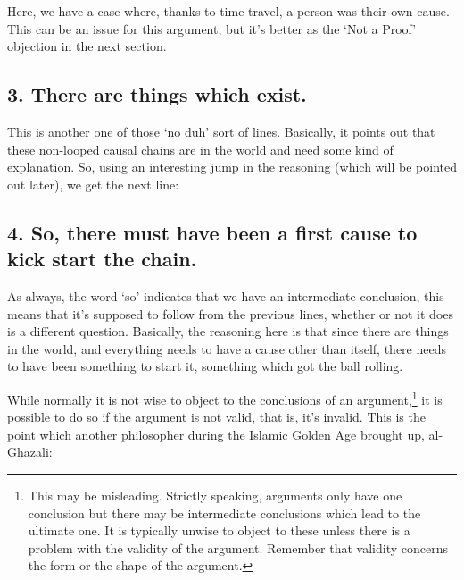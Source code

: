 Here, we have a case where, thanks to time-travel, a person was their own cause. This can be an issue for this argument, but it's better as the `Not a Proof' objection in the next section. 

\subsection{3. There are things which exist.}

This is another one of those `no duh' sort of lines. Basically, it points out that these non-looped causal chains are in the world and need some kind of explanation. So, using an interesting jump in the reasoning (which will be pointed out later), we get the next line:

\subsection{4. So, there must have been a first cause to kick start the chain.}

As always, the word `so' indicates that we have an intermediate conclusion, this means that it's supposed to follow from the previous lines, whether or not it does is a different question. Basically, the reasoning here is that since there are things in the world, and everything needs to have a cause other than itself, there needs to have been something to start it, something which got the ball rolling.

While normally it is not wise to object to the conclusions of an argument,\footnote{This may be misleading. Strictly speaking, arguments only have one conclusion but there may be intermediate conclusions which lead to the ultimate one. It is typically unwise to object to these unless there is a problem with the validity of the argument. Remember that validity concerns the form or the shape of the argument.} it is possible to do so if the argument is not \gls{valid}, that is, it's invalid. This is the point which another philosopher during the Islamic Golden Age brought up, al-Ghazali: 


